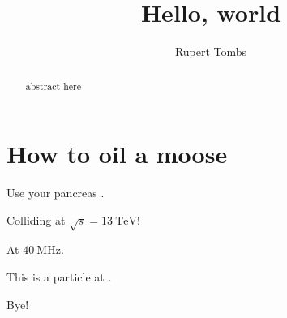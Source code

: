 \documentclass[]{article}
\title{Hello, world}
\author{Rupert Tombs}
\begin{document}
\maketitle

\begin{abstract}
abstract here
\end{abstract}

\section{How to oil a moose}

Use your pancreas \cite{helas}.

Colliding at $\sqrt{s} = \SI{13}{\TeV}$!

At $\SI{40}{\MHz}$.

This is a  particle at \CERN.

Bye!

{}

\end{document}

